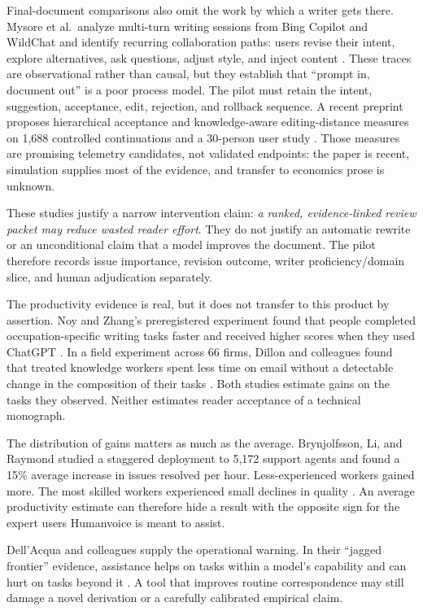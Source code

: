 Final-document comparisons also omit the work by which a writer gets there.
Mysore et al.\ analyze multi-turn writing sessions from Bing Copilot and
WildChat and identify recurring collaboration paths: users revise their
intent, explore alternatives, ask questions, adjust style, and inject content
\citep{mysore2025paths}. These traces are observational rather than causal,
but they establish that ``prompt in, document out'' is a poor process model.
The pilot must retain the intent, suggestion, acceptance, edit, rejection,
and rollback sequence. A recent preprint proposes hierarchical acceptance and
knowledge-aware editing-distance measures on 1,688 controlled continuations
and a 30-person user study \citep{fang2026mindcopilot}. Those measures are
promising telemetry candidates, not validated endpoints: the paper is recent,
simulation supplies most of the evidence, and transfer to economics prose is
unknown.

These studies justify a narrow intervention claim: \emph{a ranked,
evidence-linked review packet may reduce wasted reader effort}. They do not
justify an automatic rewrite or an unconditional claim that a model improves
the document. The pilot therefore records issue importance, revision outcome,
writer proficiency/domain slice, and human adjudication separately.

The productivity evidence is real, but it does not transfer to this product by
assertion. Noy and Zhang's preregistered experiment found that people completed
occupation-specific writing tasks faster and received higher scores when they
used ChatGPT \citep{noy2023experimental}. In a field experiment across 66
firms, Dillon and colleagues found that treated knowledge workers spent less
time on email without a detectable change in the composition of their tasks
\citep{dillon2025shifting}. Both studies estimate gains on the tasks they
observed. Neither estimates reader acceptance of a technical monograph.

The distribution of gains matters as much as the average. Brynjolfsson, Li,
and Raymond studied a staggered deployment to 5,172 support agents and found a
15\% average increase in issues resolved per hour. Less-experienced workers
gained more. The most skilled workers experienced small declines in quality
\citep{brynjolfsson2025work}. An average productivity estimate can therefore
hide a result with the opposite sign for the expert users Humanvoice is meant
to assist.

Dell'Acqua and colleagues supply the operational warning. In their
``jagged frontier'' evidence, assistance helps on tasks within a model's
capability and can hurt on tasks beyond it \citep{dellacqua2026jagged}. A tool
that improves routine correspondence may still damage a novel derivation or a
carefully calibrated empirical claim.

